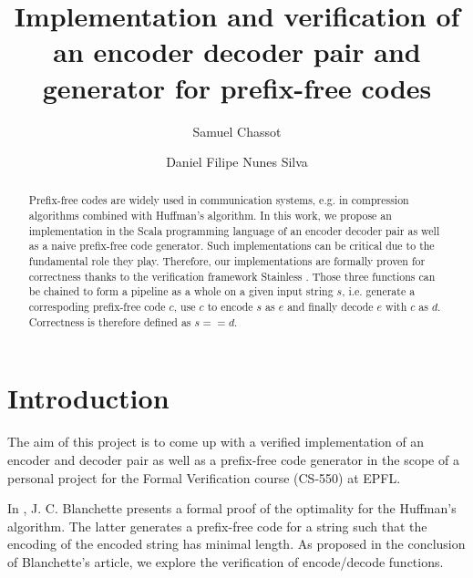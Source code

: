 \documentclass[a4paper,UKenglish,cleveref, autoref, thm-restate]{lipics-v2021}
\title{Implementation and verification of an encoder decoder pair and generator for prefix-free codes}
\author{Samuel Chassot}{EPFL}{samuel.chassot@epfl.ch}{}{}
\author{Daniel Filipe Nunes Silva}{EPFL}{daniel.nunessilva@epfl.ch}{}{}
\begin{document}
\maketitle

\begin{abstract}
    Prefix-free codes are widely used in communication systems, e.g. in compression algorithms combined with Huffman's algorithm. In this work, we propose an implementation in the Scala programming language of an encoder decoder pair as well as a naive prefix-free code generator. Such implementations can be critical due to the fundamental role they play. Therefore, our implementations are formally proven for correctness thanks to the verification framework Stainless \cite{stainless}. Those three functions can be chained to form a pipeline as a whole on a given input string $s$, i.e. generate a correspoding prefix-free code $c$, use $c$ to encode $s$ as $e$ and finally decode $e$ with $c$ as $d$. Correctness is therefore defined as $s == d$.
\end{abstract}

\lstset{language=scala}


\section{Introduction}
\label{sec:intro}

The aim of this project is to come up with a verified implementation of an encoder and decoder pair as well as a prefix-free code generator in the scope of a personal project for the Formal Verification course (CS-550) at EPFL.

In \cite{blanchette}, J. C. Blanchette presents a formal proof of the optimality for the Huffman's algorithm. The latter generates a prefix-free code for a string such that the encoding of the encoded string has minimal length. As proposed in the conclusion of Blanchette's article, we explore the verification of encode/decode functions.
\end{document}
